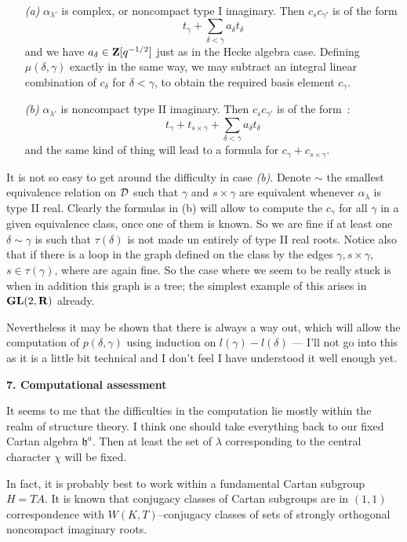 \documentclass[11 pt]{article}
\def\a{\alpha}
\def\D{{\cal D}}
\def\d{\delta}
\def\GL{{\bf GL}}
\def\g{\gamma}
\def\hf{{\mathfrak h}}
\def\l{\lambda}
\def\qmh{q^{-1/2}}
\def\R{{\bf R}}
\def\Z{{\bf Z}}
\begin{document}
\begin{itemize}
\item[\it(a)]$\a_{\l'}$ is complex, or noncompact type I imaginary. Then 
$c_sc_{\g'}$ is of the form
$$
t_\g+\sum_{\d<\g}a_\d t_\d
$$
and we have $a_\d\in\Z[\qmh]$ just as in the Hecke algebra case. Defining
$\mu(\d,\g)$ exactly in the same way, we may subtract an integral linear
combination of $c_\d$ for $\d<\g$, to obtain the required basis element $c_\g$.
\item[\it(b)]$\a_{\l'}$ is noncompact type II imaginary. Then $c_sc_{\g'}$ is
of the form~:
$$
t_\g+t_{s\times\g}+\sum_{\d<\g}a_\d t_\d
$$
and the same kind of thing will lead to a formula for $c_\g+c_{s\times\g}$.
\end{itemize}

It is not so easy to get around the difficulty in case {\em (b)}. Denote $\sim$
the smallest equivalence relation on $\D$ such that $\g$ and
$s\times\g$ are equivalent whenever $\a_\l$ is type II real. Clearly the
formulas in (b) will allow to compute the $c_\g$ for all $\g$ in a given
equivalence class, once one of them is known. So we are fine if at least one
$\d\sim\g$ is such that $\tau(\d)$ is not made un entirely of type II real
roots. Notice also that if there is a loop in the graph defined on the class
by the edges $\g,s\times\g$, $s\in\tau(\g)$, where are again fine. So the
case where we seem to be really stuck is when in addition this graph is a tree;
the simplest example of this arises in $\GL(2,\R)$ already.

Nevertheless it may be shown that there is always a way out, which will allow
the computation of $p(\d,\g)$ using induction on $l(\g)-l(\d)$ --- I'll not go
into this as it is a little bit technical and I don't feel I have understood
it well enough yet.

\bigskip

\noindent\textbf{7. Computational assessment}

\medskip

It seems to me that the difficulties in the computation lie mostly within
the realm of structure theory. I think one should take everything back to our 
fixed Cartan algebra $\hf^a$. Then at least the set of $\l$ corresponding
to the central character $\chi$ will be fixed.

In fact, it is probably best to work within a fundamental Cartan subgroup
$H=TA$. It is known that conjugacy classes of Cartan subgroups are in
$(1,1)$ correspondence with $W(K,T)$--conjugacy classes of sets of
strongly orthogonal noncompact imaginary roots.
\end{document}
